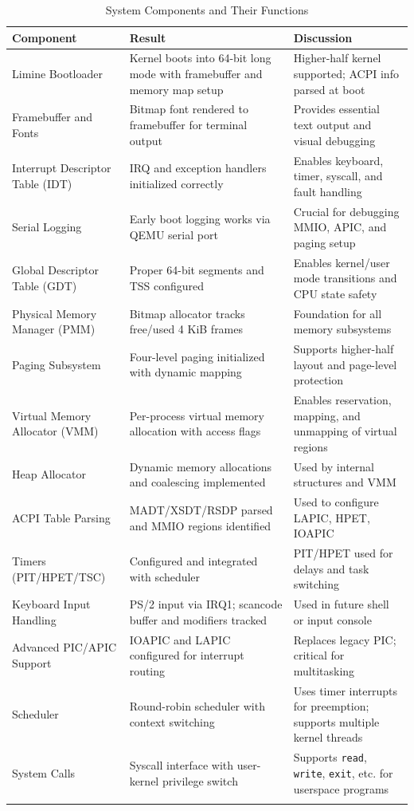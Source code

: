 \documentclass[12pt]{extarticle}
\begin{document}
\begin{longtable}{|p{4cm}|p{4cm}|p{7cm}|}
\hline
\textbf{Component} & \textbf{Result} & \textbf{Discussion} \\
\hline
Limine Bootloader & Kernel boots into 64-bit long mode with framebuffer and memory map setup & Higher-half kernel supported; ACPI info parsed at boot \\
\hline
Framebuffer and Fonts & Bitmap font rendered to framebuffer for terminal output & Provides essential text output and visual debugging \\
\hline
Interrupt Descriptor Table (IDT) & IRQ and exception handlers initialized correctly & Enables keyboard, timer, syscall, and fault handling \\
\hline
Serial Logging & Early boot logging works via QEMU serial port & Crucial for debugging MMIO, APIC, and paging setup \\
\hline
Global Descriptor Table (GDT) & Proper 64-bit segments and TSS configured & Enables kernel/user mode transitions and CPU state safety \\
\hline
Physical Memory Manager (PMM) & Bitmap allocator tracks free/used 4 KiB frames & Foundation for all memory subsystems \\
\hline
Paging Subsystem & Four-level paging initialized with dynamic mapping & Supports higher-half layout and page-level protection \\
\hline
Virtual Memory Allocator (VMM) & Per-process virtual memory allocation with access flags & Enables reservation, mapping, and unmapping of virtual regions \\
\hline
Heap Allocator & Dynamic memory allocations and coalescing implemented & Used by internal structures and VMM \\
\hline
ACPI Table Parsing & MADT/XSDT/RSDP parsed and MMIO regions identified & Used to configure LAPIC, HPET, IOAPIC \\
\hline
Timers (PIT/HPET/TSC) & Configured and integrated with scheduler & PIT/HPET used for delays and task switching \\
\hline
Keyboard Input Handling & PS/2 input via IRQ1; scancode buffer and modifiers tracked & Used in future shell or input console \\
\hline
Advanced PIC/APIC Support & IOAPIC and LAPIC configured for interrupt routing & Replaces legacy PIC; critical for multitasking \\
\hline
Scheduler & Round-robin scheduler with context switching & Uses timer interrupts for preemption; supports multiple kernel threads \\
\hline
System Calls & Syscall interface with user-kernel privilege switch & Supports \texttt{read}, \texttt{write}, \texttt{exit}, etc. for userspace programs \\
\hline

\caption{System Components and Their Functions} \label{tab:system_components} \\
\end{longtable}
\end{document}
